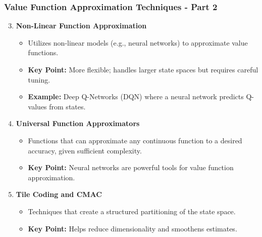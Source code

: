 \documentclass[aspectratio=169]{beamer}
\begin{document}
\begin{frame}[fragile]
    \frametitle{Value Function Approximation Techniques - Part 2}
    \begin{enumerate}
        \setcounter{enumi}{2}
        \item \textbf{Non-Linear Function Approximation}
            \begin{itemize}
                \item Utilizes non-linear models (e.g., neural networks) to approximate value functions.
                \item \textbf{Key Point:} More flexible; handles larger state spaces but requires careful tuning.
                \item \textbf{Example:} Deep Q-Networks (DQN) where a neural network predicts Q-values from states.
            \end{itemize}
        \item \textbf{Universal Function Approximators}
            \begin{itemize}
                \item Functions that can approximate any continuous function to a desired accuracy, given sufficient complexity.
                \item \textbf{Key Point:} Neural networks are powerful tools for value function approximation.
            \end{itemize}
        \item \textbf{Tile Coding and CMAC}
            \begin{itemize}
                \item Techniques that create a structured partitioning of the state space.
                \item \textbf{Key Point:} Helps reduce dimensionality and smoothens estimates.
            \end{itemize}
    \end{enumerate}
\end{frame}
\end{document}
